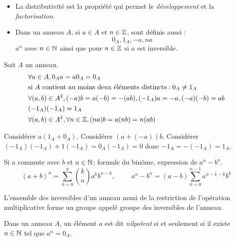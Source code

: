 \begin{rems}
\begin{itemize}
  \item La distributivité est la propriété qui permet le \emph{développement} et la \emph{factorisation}.
  \item Dans un anneau $A$, si $a\in A$ et $n\in \mathbb{Z}$, sont définis aussi :
\begin{displaymath}
  0_A, 1_A, -a, na
\end{displaymath}
$a^n$ avec $n\in \mathbb{N}$ ainsi que pour $n\in \mathbb{Z}$ si $a$ est inversible.
\end{itemize}
\end{rems}
\begin{prop}
  Soit $A$ un anneau.
\begin{align*}
  &\forall a\in A, 0_Aa = a0_A = 0_A\\
  &\text{si $A$ contient au moins deux éléments distincts}: 0_A \neq 1_A\\
  &\forall(a,b)\in A^2, (-a)b = a(-b) = -(ab), (-1_A)a = -a, (-a)(-b) = ab \\
  &(-1_A)(-1_A) = 1_A \\
  &\forall(a,b)\in A^2, \forall n\in \mathbb{Z}, (na)b = a(nb) = n(ab)\\
\end{align*}
\end{prop}
\begin{demo}
Considérer $a(1_A + 0_A)$.  Considérer $(a+(-a))b$. Considérer $(-1_A)(-1_A)+1(-1_A) = 0_A (-1_A) = 0$ donc $-1_A = -(-1_A) = 1_A$.
\end{demo}
Si $a$ commute avec $b$ et $n\in \mathbb{N}$: formule du binôme, expression de $a^n - b^n$.
\begin{displaymath}
 (a+b)^n = \sum_{k=0}^{n} \binom{k}{n}a^kb^{n-k}, \hspace{1cm}a^n - b^n = (a-b)\sum_{k=0}^{n-1}a^{n-1-k}b^k
\end{displaymath}

\begin{prop}
  L'ensemble des inversibles d'un anneau muni de la restriction de l'opération multiplicative forme un groupe appelé groupe des inversibles de l'anneau.
\end{prop}

\begin{defi}
  Dans un anneau $A$, un élément $a$ est dit \emph{nilpotent} si et seulement si il existe $n\in \mathbb{N}$ tel que $a^n = 0_A$.
\end{defi}

